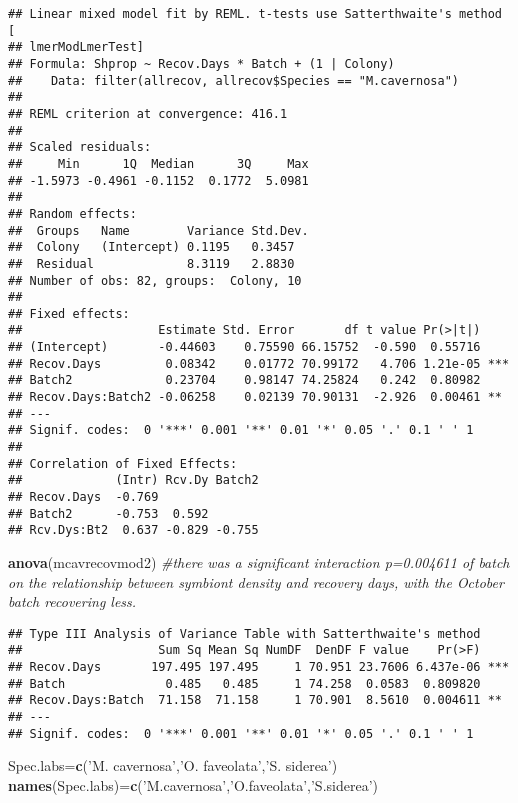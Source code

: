 \documentclass[]{article}
\newenvironment{Shaded}{\begin{snugshade}}{\end{snugshade}}
\newcommand{\CommentTok}[1]{\textcolor[rgb]{0.56,0.35,0.01}{\textit{#1}}}
\newcommand{\KeywordTok}[1]{\textcolor[rgb]{0.13,0.29,0.53}{\textbf{#1}}}
\newcommand{\NormalTok}[1]{#1}
\newcommand{\StringTok}[1]{\textcolor[rgb]{0.31,0.60,0.02}{#1}}
\begin{document}
\begin{verbatim}
## Linear mixed model fit by REML. t-tests use Satterthwaite's method [
## lmerModLmerTest]
## Formula: Shprop ~ Recov.Days * Batch + (1 | Colony)
##    Data: filter(allrecov, allrecov$Species == "M.cavernosa")
## 
## REML criterion at convergence: 416.1
## 
## Scaled residuals: 
##     Min      1Q  Median      3Q     Max 
## -1.5973 -0.4961 -0.1152  0.1772  5.0981 
## 
## Random effects:
##  Groups   Name        Variance Std.Dev.
##  Colony   (Intercept) 0.1195   0.3457  
##  Residual             8.3119   2.8830  
## Number of obs: 82, groups:  Colony, 10
## 
## Fixed effects:
##                   Estimate Std. Error       df t value Pr(>|t|)    
## (Intercept)       -0.44603    0.75590 66.15752  -0.590  0.55716    
## Recov.Days         0.08342    0.01772 70.99172   4.706 1.21e-05 ***
## Batch2             0.23704    0.98147 74.25824   0.242  0.80982    
## Recov.Days:Batch2 -0.06258    0.02139 70.90131  -2.926  0.00461 ** 
## ---
## Signif. codes:  0 '***' 0.001 '**' 0.01 '*' 0.05 '.' 0.1 ' ' 1
## 
## Correlation of Fixed Effects:
##             (Intr) Rcv.Dy Batch2
## Recov.Days  -0.769              
## Batch2      -0.753  0.592       
## Rcv.Dys:Bt2  0.637 -0.829 -0.755
\end{verbatim}

\begin{Shaded}
\begin{Highlighting}[]
  \KeywordTok{anova}\NormalTok{(mcavrecovmod2) }\CommentTok{#there was a significant interaction p=0.004611 of batch on the relationship between symbiont density and recovery days, with the October batch recovering less.}
\end{Highlighting}
\end{Shaded}

\begin{verbatim}
## Type III Analysis of Variance Table with Satterthwaite's method
##                   Sum Sq Mean Sq NumDF  DenDF F value    Pr(>F)    
## Recov.Days       197.495 197.495     1 70.951 23.7606 6.437e-06 ***
## Batch              0.485   0.485     1 74.258  0.0583  0.809820    
## Recov.Days:Batch  71.158  71.158     1 70.901  8.5610  0.004611 ** 
## ---
## Signif. codes:  0 '***' 0.001 '**' 0.01 '*' 0.05 '.' 0.1 ' ' 1
\end{verbatim}

\begin{Shaded}
\begin{Highlighting}[]
\NormalTok{  Spec.labs=}\KeywordTok{c}\NormalTok{(}\StringTok{'M. cavernosa'}\NormalTok{,}\StringTok{'O. faveolata'}\NormalTok{,}\StringTok{'S. siderea'}\NormalTok{)}
\KeywordTok{names}\NormalTok{(Spec.labs)=}\KeywordTok{c}\NormalTok{(}\StringTok{'M.cavernosa'}\NormalTok{,}\StringTok{'O.faveolata'}\NormalTok{,}\StringTok{'S.siderea'}\NormalTok{)}
\end{Highlighting}
\end{Shaded}
\end{document}
